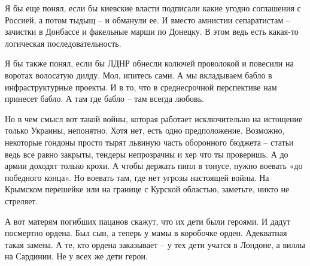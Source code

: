 Я бы еще понял, если бы киевские власти подписали какие угодно соглашения с
Россией, а потом тыдыщ – и обманули ее. И вместо амнистии сепаратистам –
зачистки в Донбассе и факельные марши по Донецку. В этом ведь есть какая-то
логическая последовательность.

Я бы также понял, если бы ЛДНР обнесли колючей проволокой и повесили на воротах
волосатую дилду. Мол, ипитесь сами. А мы вкладываем бабло в инфраструктурные
проекты. И в то, что в среднесрочной перспективе нам принесет бабло. А там где
бабло – там всегда любовь.

Но в чем смысл вот такой войны, которая работает исключительно на истощение
только Украины, непонятно. Хотя нет, есть одно предположение. Возможно,
некоторые гондоны просто тырят львиную часть оборонного бюджета – статьи ведь
все равно закрыты, тендеры непрозрачны и хер что ты проверишь. А до армии
доходят только крохи. А чтобы держать пипл в тонусе, нужно воевать «до
победного конца». Но воевать там, где нет угрозы настоящей войны. На Крымском
перешейке или на границе с Курской областью, заметьте, никто не стреляет.

А вот матерям погибших пацанов скажут, что их дети были героями. И дадут
посмертно ордена. Был сын, а теперь у мамы в коробочке орден. Адекватная такая
замена. А те, кто ордена заказывает – у тех дети учатся в Лондоне, а виллы на
Сардинии. Не у всех же дети герои.
